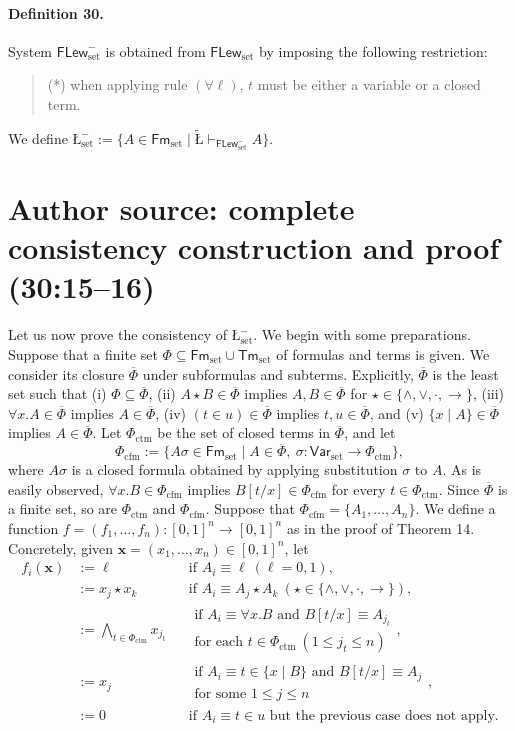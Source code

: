 \documentclass[10pt,a4paper]{article}
\newcommand{\FLew}{\mathsf{FLew}}
\newcommand{\Luk}{\text{\L}}
\begin{document}
\paragraph{Definition 30.} System $\FLew_{\mathrm{set}}^{-}$ is obtained from $\FLew_{\mathrm{set}}$ by imposing the following restriction:
\begin{quote}
(*) when applying rule $(\forall\ell)$, $t$ must be either a variable or a closed term.
\end{quote}
We define $\Luk_{\mathrm{set}}^{-}:=\{A\in\mathsf{Fm}_{\mathrm{set}}\mid\widetilde{\Luk}\vdash_{\FLew_{\mathrm{set}}^{-}}A\}$.

\section*{Author source: complete consistency construction and proof (30:15--16)}
Let us now prove the consistency of $\Luk_{\mathrm{set}}^{-}$. We begin with some preparations. Suppose that a finite set $\Phi\subseteq\mathsf{Fm}_{\mathrm{set}}\cup\mathsf{Tm}_{\mathrm{set}}$ of formulas and terms is given. We consider its closure $\overline\Phi$ under subformulas and subterms. Explicitly, $\overline\Phi$ is the least set such that (i) $\Phi\subseteq\overline\Phi$, (ii) $A\star B\in\overline\Phi$ implies $A,B\in\overline\Phi$ for $\star\in\{\wedge,\vee,\cdot,\to\}$, (iii) $\forall x.A\in\overline\Phi$ implies $A\in\overline\Phi$, (iv) $(t\in u)\in\overline\Phi$ implies $t,u\in\overline\Phi$, and (v) $\{x\mid A\}\in\overline\Phi$ implies $A\in\overline\Phi$.
Let $\Phi_{\mathrm{ctm}}$ be the set of closed terms in $\overline\Phi$, and let
\[
 \Phi_{\mathrm{cfm}}:=\{A\sigma\in\mathsf{Fm}_{\mathrm{set}}\mid A\in\overline\Phi,\ \sigma:\mathsf{Var}_{\mathrm{set}}\to\Phi_{\mathrm{ctm}}\},
\]
where $A\sigma$ is a closed formula obtained by applying substitution $\sigma$ to $A$. As is easily observed, $\forall x.B\in\Phi_{\mathrm{cfm}}$ implies $B[t/x]\in\Phi_{\mathrm{cfm}}$ for every $t\in\Phi_{\mathrm{ctm}}$. Since $\overline\Phi$ is a finite set, so are $\Phi_{\mathrm{ctm}}$ and $\Phi_{\mathrm{cfm}}$.
Suppose that $\Phi_{\mathrm{cfm}}=\{A_1,\ldots,A_n\}$. We define a function $f=(f_1,\ldots,f_n):[0,1]^n\to[0,1]^n$ as in the proof of Theorem 14. Concretely, given $\mathbf x=(x_1,\ldots,x_n)\in[0,1]^n$, let
\[
\begin{aligned}
 f_i(\mathbf x)&:=\ell&&\text{if }A_i\equiv\ell\ (\ell=0,1),\\
 &:=x_j\star x_k&&\text{if }A_i\equiv A_j\star A_k\ (\star\in\{\wedge,\vee,\cdot,\to\}),\\
 &:=\bigwedge_{t\in\Phi_{\mathrm{ctm}}}x_{j_t}&&\substack{\text{if }A_i\equiv\forall x.B\text{ and }B[t/x]\equiv A_{j_t}\\\text{for each }t\in\Phi_{\mathrm{ctm}}\ (1\le j_t\le n)},\\
 &:=x_j&&\substack{\text{if }A_i\equiv t\in\{x\mid B\}\text{ and }B[t/x]\equiv A_j\\\text{for some }1\le j\le n},\\
 &:=0&&\text{if }A_i\equiv t\in u\text{ but the previous case does not apply.}
\end{aligned}
\]
\end{document}
